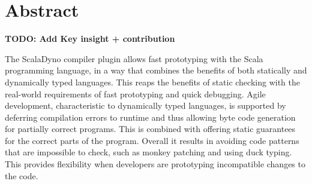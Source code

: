 \section{Abstract}




\textbf{TODO: Add Key insight + contribution}

The ScalaDyno compiler plugin allows fast prototyping with the Scala programming language, in a way that combines the benefits of both statically and dynamically typed languages. This reaps the benefits of static checking with the real-world requirements of fast prototyping and quick debugging. Agile development, characteristic to dynamically typed languages, is supported by deferring compilation errors to runtime and thus allowing byte code generation for partially correct programs. This is combined with offering static guarantees for the correct parts of the program. Overall it results in avoiding code patterns that are impossible to check, such as monkey patching and using duck typing. This provides flexibility when developers are prototyping incompatible changes to the code.

